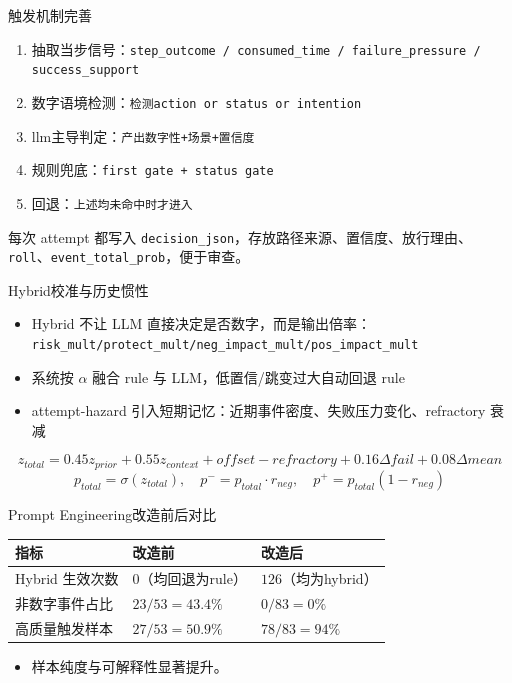 \documentclass[aspectratio=169]{beamer}
\begin{document}
\begin{frame}{触发机制完善}
    \begin{enumerate}
        \item 抽取当步信号：\texttt{step\_outcome / consumed\_time / failure\_pressure / success\_support}
        \item 数字语境检测：\texttt{检测action or status or intention }
        \item llm主导判定：\texttt{产出数字性+场景+置信度}
        \item 规则兜底：\texttt{first gate + status gate}
        \item 回退：\texttt{上述均未命中时才进入}
    \end{enumerate}
    \vspace{0.2cm}
    每次 attempt 都写入 \texttt{decision\_json}，存放路径来源、置信度、放行理由、\texttt{roll}、\texttt{event\_total\_prob}，便于审查。
\end{frame}



\begin{frame}{Hybrid校准与历史惯性}
    \begin{itemize}
        \item Hybrid 不让 LLM 直接决定是否数字，而是输出倍率：\texttt{risk\_mult/protect\_mult/neg\_impact\_mult/pos\_impact\_mult}
        \item 系统按 \(\alpha\) 融合 rule 与 LLM，低置信/跳变过大自动回退 rule
        \item attempt-hazard 引入短期记忆：近期事件密度、失败压力变化、refractory 衰减
    \end{itemize}
    \vspace{0.2cm}
    \[
    z_{total}=0.45 z_{prior}+0.55 z_{context}+offset-refractory+0.16\Delta fail+0.08\Delta mean
    \]
    \[
    p_{total}=\sigma(z_{total}),\quad
    p^- = p_{total}\cdot r_{neg},\quad
    p^+ = p_{total}(1-r_{neg})
    \]
\end{frame}

\begin{frame}{Prompt Engineering改造前后对比}
    \begin{center}
        \small
        \begin{tabular}{p{3.3cm}p{2.8cm}p{2.8cm}}
            \toprule
            指标 & 改造前 & 改造后 \\
            \midrule
            Hybrid 生效次数 & \(0\)（均回退为rule） & \(126\)（均为hybrid） \\
            非数字事件占比 & \(23/53=43.4\%\) & \(0/83=0\%\) \\
            高质量触发样本 & \(27/53=50.9\%\) & \(78/83=94\%\) \\
            \bottomrule
        \end{tabular}
    \end{center}
    \vspace{0.2cm}
    \begin{itemize}
        \item 样本纯度与可解释性显著提升。
    \end{itemize}
\end{frame}
\end{document}
